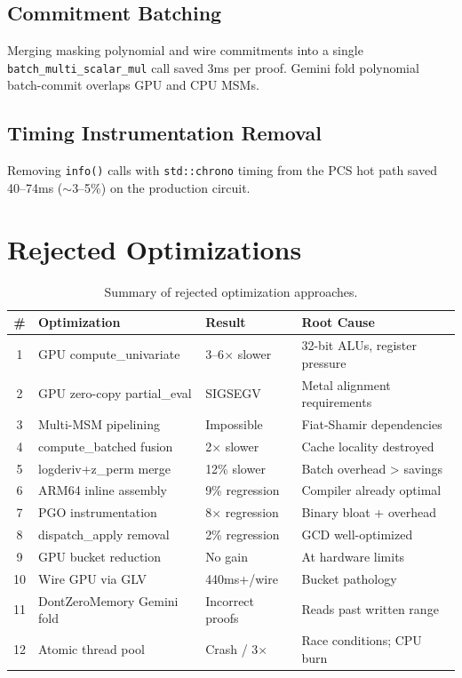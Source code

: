 \documentclass[11pt,a4paper]{article}
\begin{document}
\subsection{Commitment Batching}

Merging masking polynomial and wire commitments into a single \texttt{batch\_multi\_scalar\_mul} call saved 3ms per proof. Gemini fold polynomial batch-commit overlaps GPU and CPU MSMs.

\subsection{Timing Instrumentation Removal}

Removing \texttt{info()} calls with \texttt{std::chrono} timing from the PCS hot path saved 40--74ms ($\sim$3--5\%) on the production circuit.

\section{Rejected Optimizations}

\begin{table}[H]
\centering
\small
\begin{tabular}{clll}
\toprule
\textbf{\#} & \textbf{Optimization} & \textbf{Result} & \textbf{Root Cause} \\
\midrule
1 & GPU compute\_univariate & 3--6$\times$ slower & 32-bit ALUs, register pressure \\
2 & GPU zero-copy partial\_eval & SIGSEGV & Metal alignment requirements \\
3 & Multi-MSM pipelining & Impossible & Fiat-Shamir dependencies \\
4 & compute\_batched fusion & 2$\times$ slower & Cache locality destroyed \\
5 & logderiv+z\_perm merge & 12\% slower & Batch overhead > savings \\
6 & ARM64 inline assembly & 9\% regression & Compiler already optimal \\
7 & PGO instrumentation & 8$\times$ regression & Binary bloat + overhead \\
8 & dispatch\_apply removal & 2\% regression & GCD well-optimized \\
9 & GPU bucket reduction & No gain & At hardware limits \\
10 & Wire GPU via GLV & 440ms+/wire & Bucket pathology \\
11 & DontZeroMemory Gemini fold & Incorrect proofs & Reads past written range \\
12 & Atomic thread pool & Crash / 3$\times$ & Race conditions; CPU burn \\
\bottomrule
\end{tabular}
\caption{Summary of rejected optimization approaches.}
\end{table}
\end{document}
